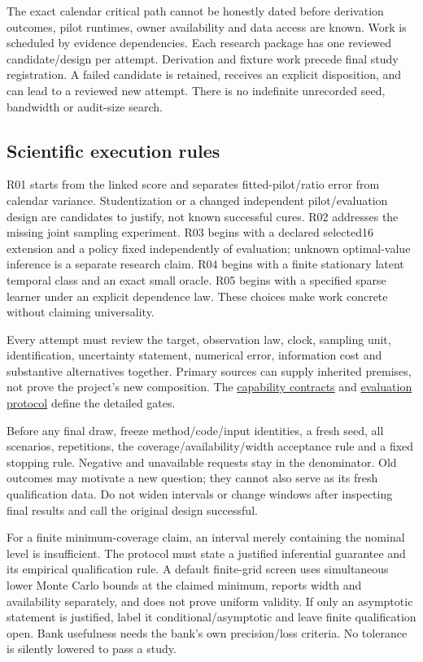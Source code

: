 \documentclass[
  11pt,
  a4paper,
]{article}
\begin{document}
The exact calendar critical path cannot be honestly dated before
derivation outcomes, pilot runtimes, owner availability and data access
are known. Work is scheduled by evidence dependencies. Each research
package has one reviewed candidate/design per attempt. Derivation and
fixture work precede final study registration. A failed candidate is
retained, receives an explicit disposition, and can lead to a reviewed
new attempt. There is no indefinite unrecorded seed, bandwidth or
audit-size search.

\hypertarget{scientific-execution-rules}{%
\subsection{Scientific execution
rules}\label{scientific-execution-rules}}

R01 starts from the linked score and separates fitted-pilot/ratio error
from calendar variance. Studentization or a changed independent
pilot/evaluation design are candidates to justify, not known successful
cures. R02 addresses the missing joint sampling experiment. R03 begins
with a declared selected16 extension and a policy fixed independently of
evaluation; unknown optimal-value inference is a separate research
claim. R04 begins with a finite stationary latent temporal class and an
exact small oracle. R05 begins with a specified sparse learner under an
explicit dependence law. These choices make work concrete without
claiming universality.

Every attempt must review the target, observation law, clock, sampling
unit, identification, uncertainty statement, numerical error,
information cost and substantive alternatives together. Primary sources
can supply inherited premises, not prove the project's new composition.
The \href{master/capability-contracts.md}{capability contracts} and
\href{master/evaluation-protocol.md}{evaluation protocol} define the
detailed gates.

Before any final draw, freeze method/code/input identities, a fresh
seed, all scenarios, repetitions, the coverage/availability/width
acceptance rule and a fixed stopping rule. Negative and unavailable
requests stay in the denominator. Old outcomes may motivate a new
question; they cannot also serve as its fresh qualification data. Do not
widen intervals or change windows after inspecting final results and
call the original design successful.

For a finite minimum-coverage claim, an interval merely containing the
nominal level is insufficient. The protocol must state a justified
inferential guarantee and its empirical qualification rule. A default
finite-grid screen uses simultaneous lower Monte Carlo bounds at the
claimed minimum, reports width and availability separately, and does not
prove uniform validity. If only an asymptotic statement is justified,
label it conditional/asymptotic and leave finite qualification open.
Bank usefulness needs the bank's own precision/loss criteria. No
tolerance is silently lowered to pass a study.
\end{document}
